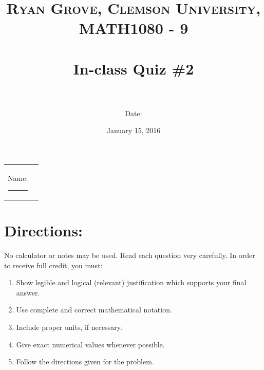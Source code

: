 \documentclass[paper=a4, fontsize=11pt]{scrartcl} %
\title{	
\normalfont \normalsize 
\textsc{Ryan Grove, Clemson University, MATH1080 - 9} \\ [25pt] %
\horrule{0.5pt} \\[0.4cm] %
\huge In-class Quiz \#2 \\ %
\horrule{2pt} \\[0.5cm] %
}
\author{Date:} %
\date{\normalsize January 15, 2016} %
\numberwithin{equation}{section} %
\numberwithin{figure}{section} %
\numberwithin{table}{section} %
\begin{document}
\maketitle %

\begin{flushleft}
\begin{tabular}{l l}
Name: \rule{3.2in}{.01cm}  & {}%
\end{tabular}
\end{flushleft}


\section*{\textbf{Directions:}}

No calculator or notes may be used.  Read each question very carefully.  In order to receive full credit, you must:
\begin{enumerate}
\item Show legible and logical (relevant) justification which supports your final answer.
\item Use complete and correct mathematical notation.
\item Include proper units, if necessary.
\item Give exact numerical values whenever possible.
\item Follow the directions given for the problem.
\end{enumerate}
\vspace{.1in}

\newpage
\end{document}
